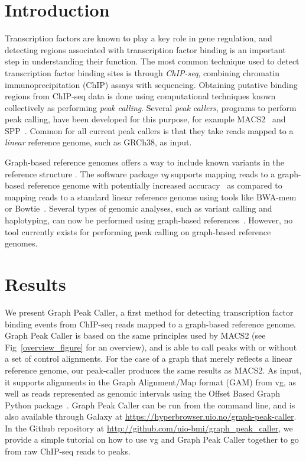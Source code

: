\documentclass[10pt,letterpaper]{article}
\begin{document}
\section*{Introduction}
Transcription factors are known to play a key role in gene regulation, and detecting regions associated with transcription factor binding is an important step in understanding their function. The most common technique used to detect transcription factor binding sites is through \emph{ChIP-seq}, combining chromatin immunoprecipitation (ChIP) assays with sequencing. Obtaining putative binding regions from ChIP-seq data is done using computational techniques known collectively as performing \emph{peak calling}. Several \emph{peak callers}, programs to perform peak calling, have been developed for this purpose, for example MACS2~\cite{macs} and SPP~\cite{spp}. Common for all current peak callers is that they take reads mapped to a \emph{linear} reference genome, such as GRCh38, as input. 

Graph-based reference genomes offers a way to include known variants in the reference structure \cite{graph_evolution}. The software package \emph{vg} supports mapping reads to a graph-based reference genome with potentially increased accuracy~\cite{vg, genome_graphs} as compared to mapping reads to a standard linear reference genome using tools like BWA-mem~\cite{bwa_mem} or Bowtie~\cite{bowtie}. Several types of genomic analyses, such as variant calling and haplotyping, can now be performed using graph-based references~\cite{vg, genome_graphs}. However, no tool currently exists for performing peak calling on graph-based reference genomes. 

\section*{Results}
We present Graph Peak Caller, a first method for detecting transcription factor binding events from ChIP-seq reads mapped to a graph-based reference genome. Graph Peak Caller is based on the same principles used by MACS2 (see Fig~\ref{overview_figure} for an overview), and  is able to call peaks with or without a set of control alignments. For the case of a graph that merely reflects a linear reference genome, our peak-caller produces the same results as MACS2. As input, it supports alignments in the Graph Alignment/Map format (GAM) from vg, as well as reads represented as genomic intervals using the Offset Based Graph Python package~\cite{rand}. Graph Peak Caller can be run from the command line, and is also available through Galaxy at \url{https://hyperbrowser.uio.no/graph-peak-caller}. In the Github repository at \url{http://github.com/uio-bmi/graph_peak_caller}, we provide a simple tutorial on how to use vg and Graph Peak Caller together to go from raw ChIP-seq reads to peaks. 
\end{document}
